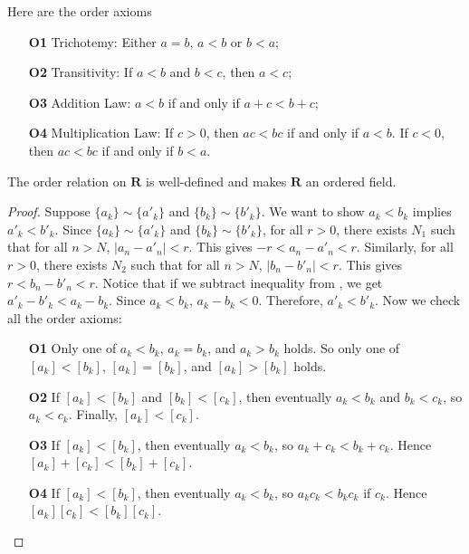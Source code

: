 \documentclass[10pt]{article}
\begin{document}
\begin{definition}
    Here are the order axioms
    \begin{enumerate}
        \item[\textbf{O1}] Trichotemy: Either $a = b$, $a < b$ or $b < a$;
        \item[\textbf{O2}] Transitivity: If $a < b$ and $b < c$, then $a < c$;
        \item[\textbf{O3}]Addition Law: $a < b$ if and only if $a + c < b + c$;
        \item[\textbf{O4}] Multiplication Law: If $c > 0$, then $ac < bc$ if and only if $a < b$. If $c < 0$, then $ac < bc$ if and only if $b < a$.
    \end{enumerate}
\end{definition}
\begin{proposition}
    The order relation on $\textbf{R}$ is well-defined and makes $\textbf{R}$ an ordered field.
\end{proposition}
\begin{proof}
    Suppose $\{a_k\}\sim \{a'_k\}$ and $\{b_k\}\sim \{b'_k\}$. We want to show $a_k<b_k$ implies $a'_k<b'_k$. Since $\{a_k\}\sim \{a'_k\}$ and $\{b_k\}\sim \{b'_k\}$, for all $r>0$, there exists $N_1$ such that for all $n>N$, $|a_n-a'_n|<r$. This gives  $-r<a_n-a'_n<r$. Similarly, for all $r>0$, there exists $N_2$ such that for all $n>N$, $|b_n-b'_n|<r$. This gives  $r<b_n-b'_n<r$.
    Notice that if we subtract inequality  from , we get $a'_k-b'_k<a_k-b_k$. Since $a_k<b_k$, $a_k-b_k<0$. Therefore, $a'_k<b'_k$. Now we check all the order axioms:
    \begin{enumerate}
        \item[\textbf{O1}] Only one of $a_k < b_k$, $a_k = b_k$, and $a_k > b_k$ holds. So only one of $[a_k] < [b_k]$, $[a_k] = [b_k]$, and $[a_k] > [b_k]$ holds.
        \item[\textbf{O2}] If $[a_k] < [b_k]$ and $[b_k] < [c_k]$, then eventually $a_k < b_k$ and $b_k < c_k$, so $a_k < c_k$. Finally, $[a_k] < [c_k]$.
        \item[\textbf{O3}] If $[a_k] < [b_k]$, then eventually $a_k < b_k$, so $a_k + c_k < b_k + c_k$. Hence $[a_k] + [c_k] < [b_k] + [c_k]$.
        \item[\textbf{O4}] If $[a_k] < [b_k]$, then eventually $a_k < b_k$, so $a_kc_k < b_kc_k$ if $c_k$. Hence $[a_k][c_k] < [b_k][c_k]$.
    \end{enumerate}
\end{proof}
\end{document}
